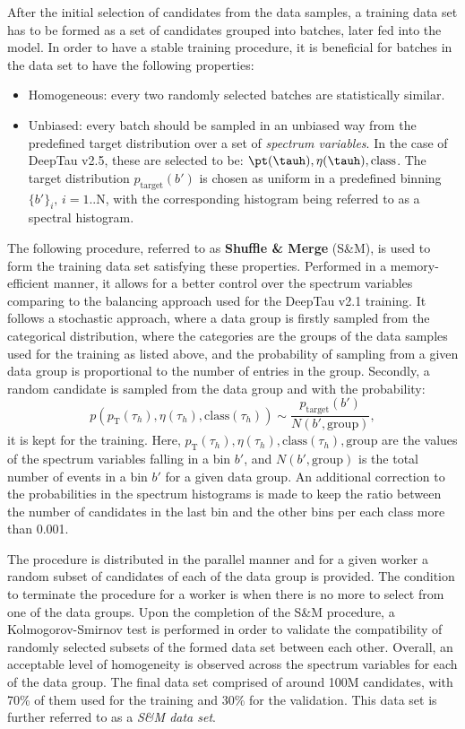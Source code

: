 After the initial selection of \tauh candidates from the data samples, a training data set has to be formed as a set of \tauh candidates grouped into batches, later fed into the model. In order to have a stable training procedure, it is beneficial for batches in the data set to have the following properties:
\begin{itemize}
    \item Homogeneous: every two randomly selected batches are statistically similar. 
    \item Unbiased: every batch should be sampled in an unbiased way from the predefined target distribution over a set of \textit{spectrum variables}. In the case of DeepTau v2.5, these are selected to be: $\pt(\tauh), \eta(\tauh), \text{class}$. The target distribution $p_\text{target}(b')$ is chosen as uniform in a predefined binning $\{b'\}_i, \, i=1..\text{N}$, with the corresponding histogram being referred to as a spectral histogram. 
\end{itemize}

The following procedure, referred to as \textbf{Shuffle \& Merge} (S\&M), is used to form the training data set satisfying these properties. Performed in a memory-efficient manner, it allows for a better control over the spectrum variables comparing to the balancing approach used for the DeepTau v2.1 training. It follows a stochastic approach, where a data group is firstly sampled from the categorical distribution, where the categories are the groups of the data samples used for the training as listed above, and the probability of sampling from a given data group is proportional to the number of entries in the group. Secondly, a random \tauh candidate is sampled from the data group and with the probability:
\begin{equation}
    p(p_\text{T}(\tau_h), \eta(\tau_h), \text{class}(\tau_h)) \sim \dfrac{p_\text{target}(b')}{N(b',\text{group})},
\end{equation}
 it is kept for the training. Here, $p_\text{T}(\tau_h), \eta(\tau_h), \text{class}(\tau_h), \text{group}$ are the values of the spectrum variables falling in a bin $b'$, and $N(b', \text{group})$ is the total number of events in a bin $b'$ for a given data group. An additional correction to the probabilities in the spectrum histograms is made to keep the ratio between the number of \tauh candidates in the last \pt bin and the other \pt bins per each class more than 0.001. 

The procedure is distributed in the parallel manner and for a given worker a random subset of \tauh candidates of each of the data group is provided. The condition to terminate the procedure for a worker is when there is no more \tauh to select from one of the data groups. Upon the completion of the S\&M procedure, a Kolmogorov-Smirnov test is performed in order to validate the compatibility of randomly selected subsets of the formed data set between each other. Overall, an acceptable level of homogeneity is observed across the spectrum variables for each of the data group. The final data set comprised of around 100M \tauh candidates, with 70\% of them used for the training and 30\% for the validation. This data set is further referred to as a \textit{S\&M data set}.  

